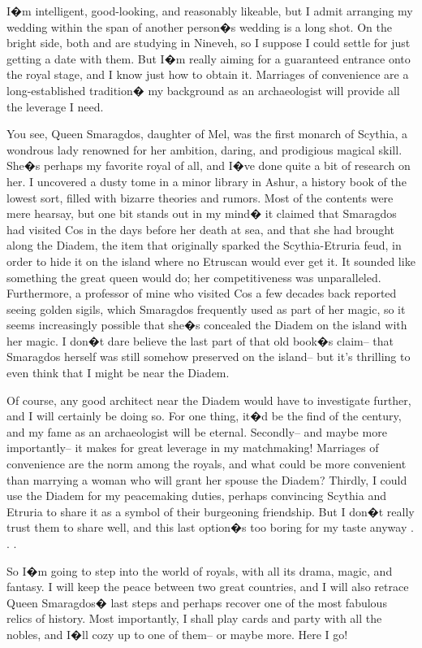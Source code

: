 \documentclass[char]{Kos}
\begin{document}
I�m intelligent, good-looking, and reasonably likeable, but I admit arranging my wedding within the span of another person�s wedding is a long shot. On the bright side, both \cPoet{\nickname} and \cWard{\nickname} are studying in Nineveh, so I suppose I could settle for just getting a date with them. But I�m really aiming for a guaranteed entrance onto the royal stage, and I know just how to obtain it. Marriages of convenience are a long-established tradition� my background as an archaeologist will provide all the leverage I need.

You see, Queen Smaragdos, daughter of Mel, was the first monarch of Scythia, a wondrous lady renowned for her ambition, daring, and prodigious magical skill. She�s perhaps my favorite royal of all, and I�ve done quite a bit of research on her. I uncovered a dusty tome in a minor library in Ashur, a history book of the lowest sort, filled with bizarre theories and rumors. Most of the contents were mere hearsay, but one bit stands out in my mind� it claimed that Smaragdos had visited Cos in the days before her death at sea, and that she had brought along the Diadem, the item that originally sparked the Scythia-Etruria feud, in order to hide it on the island where no Etruscan would ever get it. It sounded like something the great queen would do; her competitiveness was unparalleled. Furthermore, a professor of mine who visited Cos a few decades back reported seeing golden sigils, which Smaragdos frequently used as part of her magic, so it seems increasingly possible that she�s concealed the Diadem on the island with her magic. I don�t dare believe the last part of that old book�s claim-- that Smaragdos herself was still somehow preserved on the island-- but it's thrilling to even think that I might be near the Diadem.

Of course, any good architect near the Diadem would have to investigate further, and I will certainly be doing so. For one thing, it�d be the find of the century, and my fame as an archaeologist will be eternal. Secondly-- and maybe more importantly-- it makes for great leverage in my matchmaking! Marriages of convenience are the norm among the royals, and what could be more convenient than marrying a woman who will grant her spouse the Diadem? Thirdly, I could use the Diadem for my peacemaking duties, perhaps convincing Scythia and Etruria to share it as a symbol of their burgeoning friendship. But I don�t really trust them to share well, and this last option�s too boring for my taste anyway . . .

So I�m going to step into the world of royals, with all its drama, magic, and fantasy. I will keep the peace between two great countries, and I will also retrace Queen Smaragdos� last steps and perhaps recover one of the most fabulous relics of history. Most importantly, I shall play cards and party with all the nobles, and I�ll cozy up to one of them-- or maybe more. Here I go!
\end{document}
